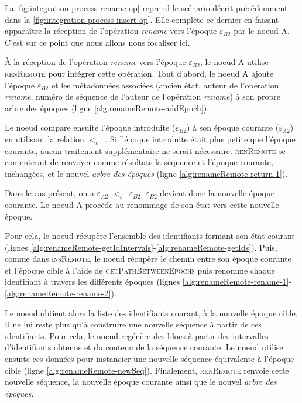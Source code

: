 \documentclass[12pt]{thesul}
\newcommand{\epoch}[1]{$\varepsilon_{#1}$}
\newcommand{\lepoch}{$<_{\varepsilon}$~}
\begin{document}
La \autoref{fig:integration-process-rename-op} reprend le scénario décrit précédemment dans la \autoref{fig:integration-process-insert-op}.
Elle complète ce dernier en faisant apparaître la réception de l'opération \emph{rename} vers l'époque \epoch{B2} par le noeud A.
C'est sur ce point que nous allons nous focaliser ici.

À la réception de l'opération \emph{rename} vers l'époque \epoch{B2}, le noeud A utilise \textsc{renRemote} pour intégrer cette opération.
Tout d'abord, le noeud A ajoute l'époque \epoch{B2} et les métadonnées associées (ancien état, auteur de l'opération \emph{rename}, numéro de séquence de l'auteur de l'opération \emph{rename}) à son propre arbre des époques (ligne \ref{alg:renameRemote-addEpoch}).

Le noeud compare ensuite l'époque introduite (\epoch{B2}) à son époque courante (\epoch{A2}) en utilisant la relation \lepoch.
Si l'époque introduite était plus petite que l'époque courante, aucun traitement supplémentaire ne serait nécessaire.
\textsc{renRemote} se contenterait de renvoyer comme résultats la séquence et l'époque courante, inchangées, et le nouvel \emph{arbre des époques} (ligne \ref{alg:renameRemote-return-1}).

Dans le cas présent, on a \epoch{A2} \lepoch \epoch{B2}.
\epoch{B2} devient donc la nouvelle époque courante.
Le noeud A procède au renommage de son état vers cette nouvelle époque.

Pour cela, le noeud récupère l'ensemble des identifiants formant son état courant (lignes \ref{alg:renameRemote-getIdIntervals}-\ref{alg:renameRemote-getIds}).
Puis, comme dans \textsc{insRemote}, le noeud récupère le chemin entre son époque courante et l'époque cible à l'aide de \textsc{getPathBetweenEpochs} puis renomme chaque identifiant à travers les différents époques (lignes \ref{alg:renameRemote-rename-1}-\ref{alg:renameRemote-rename-2}).

Le noeud obtient alors la liste des identifiants courant, à la nouvelle époque cible.
Il ne lui reste plus qu'à construire une nouvelle séquence à partir de ces identifiants.
Pour cela, le noeud regénère des blocs à partir des intervalles d'identifiants obtenus et du contenu de la séquence courante.
Le noeud utilise ensuite ces données pour instancier une nouvelle séquence équivalente à l'époque cible (ligne \ref{alg:renameRemote-newSeq}).
Finalement, \textsc{renRemote} renvoie cette nouvelle séquence, la nouvelle époque courante ainsi que le nouvel \emph{arbre des époques}.
\end{document}
